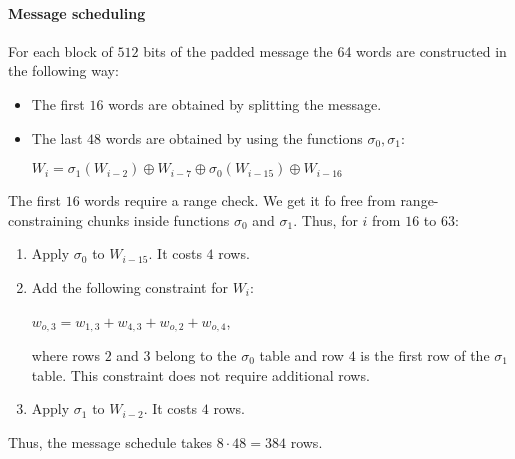 \paragraph{Message scheduling}
For each block of $512$ bits of the padded message the 64 words are constructed in the following way:
\begin{itemize}
\item The first $16$ words are obtained by splitting the message.
\item The last $48$ words are obtained by using the functions $\sigma_0, \sigma_1$:
\begin{center}
$W_i = \sigma_1(W_{i-2}) \oplus W_{i - 7} \oplus \sigma_0(W_{i-15}) \oplus W_{i-16}$
\end{center}
\end{itemize}
The first $16$ words require a range check. 
We get it fo free from range-constraining chunks inside functions $\sigma_0$ and $\sigma_1$.
Thus, for $i$ from $16$ to $63$:
\begin{enumerate}
\item Apply $\sigma_0$ to $W_{i-15}$. It costs $4$ rows.
\item Add the following constraint for $W_i$:
\begin{center}
	$w_{o,3} = w_{1, 3} + w_{4,3} + w_{o, 2} + w_{o, 4}$,
\end{center}
	where rows $2$ and $3$ belong to the $\sigma_0$ table and row $4$ is the first row of the $\sigma_1$ table. This constraint does not require additional rows. 
\item Apply $\sigma_1$ to $W_{i-2}$. It costs $4$ rows.
\end{enumerate}
Thus, the message schedule takes $8 \cdot 48 = 384$ rows.

